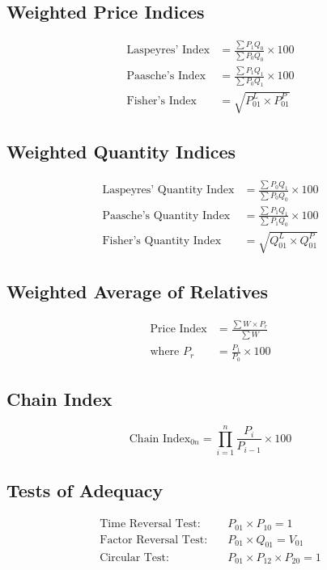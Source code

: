 \documentclass[twoside]{book}
\begin{document}
\subsection{Weighted Price Indices}
\begin{align}
\text{Laspeyres' Index} &= \frac{\sum P_1 Q_0}{\sum P_0 Q_0} \times 100 \\
\text{Paasche's Index} &= \frac{\sum P_1 Q_1}{\sum P_0 Q_1} \times 100 \\
\text{Fisher's Index} &= \sqrt{P_{01}^L \times P_{01}^P}
\end{align}

\subsection{Weighted Quantity Indices}
\begin{align}
\text{Laspeyres' Quantity Index} &= \frac{\sum P_0 Q_1}{\sum P_0 Q_0} \times 100 \\
\text{Paasche's Quantity Index} &= \frac{\sum P_1 Q_1}{\sum P_1 Q_0} \times 100 \\
\text{Fisher's Quantity Index} &= \sqrt{Q_{01}^L \times Q_{01}^P}
\end{align}

\subsection{Weighted Average of Relatives}
\begin{align}
\text{Price Index} &= \frac{\sum W \times P_r}{\sum W} \\
\text{where } P_r &= \frac{P_1}{P_0} \times 100
\end{align}

\subsection{Chain Index}
\begin{equation}
\text{Chain Index}_{0n} = \prod_{i=1}^{n} \frac{P_i}{P_{i-1}} \times 100
\end{equation}

\subsection{Tests of Adequacy}
\begin{align}
\text{Time Reversal Test:} \quad & P_{01} \times P_{10} = 1 \\
\text{Factor Reversal Test:} \quad & P_{01} \times Q_{01} = V_{01} \\
\text{Circular Test:} \quad & P_{01} \times P_{12} \times P_{20} = 1
\end{align}
\end{document}
